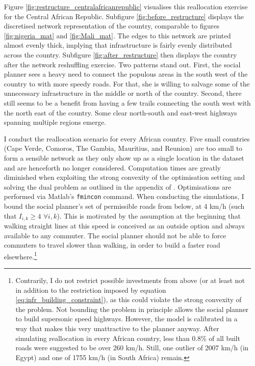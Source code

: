 \documentclass[11pt, oneside]{article}   	%
\begin{document}
Figure \ref{fig:restructure_centralafricanrepublic} visualises this reallocation exercise for the Central African Republic. Subfigure \ref{fig:before_restructure} displays the discretised network representation of the country, comparable to figures \ref{fig:nigeria_mat} and \ref{fig:Mali_mat}. The edges to this network are printed almost evenly thick, implying that infrastructure is fairly evenly distributed across the country. Subfigure \ref{fig:after_restructure} then displays the country after the network reshuffling exercise. Two patterns stand out. First, the social planner sees a heavy need to connect the populous areas in the south west of the country to with more speedy roads. For that, she is willing to salvage some of the unnecessary infrastructure in the middle or north of the country. Second, there still seems to be a benefit from having a few trails connecting the south west with the north east of the country. Some clear north-south and east-west highways spanning multiple regions emerge.

I conduct the reallocation scenario for every African country. Five small countries (Cape Verde, Comoros, The Gambia, Mauritius, and Reunion) are too small to form a sensible network as they only show up as a single location in the dataset and are henceforth no longer considered. Computation times are greatly diminished when exploiting the strong convexity of the optimisation setting and solving the dual problem as outlined in the appendix of \cite{fajgelbaum_optimal_2017}. Optimisations are performed via Matlab's \texttt{fmincon} command. When conducting the simulations, I bound the social planner's set of permissible roads from below, at 4 km/h (such that $I_{i,k} \geq 4$ $ \forall i,k$). This is motivated by the assumption at the beginning that walking straight lines at this speed is conceived as an outside option and always available to any commuter. The social planner should not be able to force commuters to travel slower than walking, in order to build a faster road elsewhere.\footnote{Contrarily, I do not restrict possible investments from above (or at least not in addition to the restriction imposed by equation \ref{eq:infr_building_constraint}), as this could violate the strong convexity of the problem. Not bounding the problem in principle allows the social planner to build supersonic speed highways. However, the model is calibrated in a way that makes this very unattractive to the planner anyway. After simulating reallocation in every African country, less than 0.8\% of all built roads were suggested to be over 260 km/h. Still, one outlier of 2007 km/h (in Egypt) and one of 1755 km/h (in South Africa) remain.}
\end{document}
